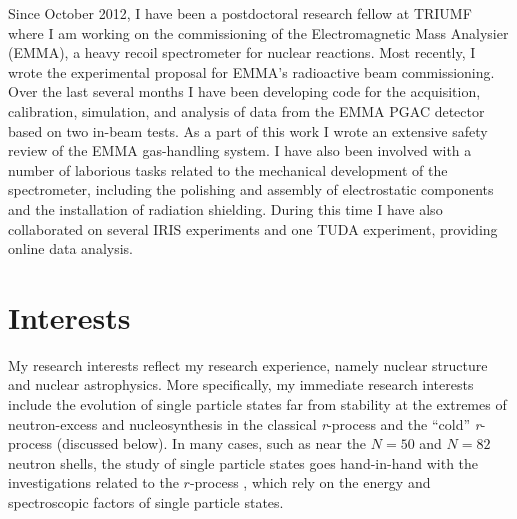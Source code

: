 {Since October 2012,
I have been a postdoctoral research fellow at TRIUMF where I am working
on the commissioning of the Electromagnetic Mass Analysier (EMMA), a heavy recoil spectrometer for nuclear reactions. %
Most recently, I wrote the experimental proposal for EMMA's radioactive beam commissioning. Over the last several months I have been developing code for the acquisition, calibration, simulation, and analysis of data from the EMMA PGAC detector based on two in-beam tests. As a part of this work I wrote an extensive safety review of the EMMA gas-handling system. I have also been involved with a number of laborious tasks related to the mechanical development of the spectrometer, including the polishing and assembly of  electrostatic components and the installation of radiation shielding.
		During this time I have also collaborated on several IRIS experiments and one TUDA experiment, providing online data analysis.

\section*{Interests}
My research interests reflect my research experience, namely nuclear structure and nuclear astrophysics.  More specifically, my immediate 
research interests include %
 the evolution of single particle states far from stability at the extremes of neutron-excess and nucleosynthesis in the classical \textit{r}-process and the ``cold'' \textit{r}-process (discussed below). In many cases, such as near the $N=50$ and $N=82$ neutron shells, the study of single particle states goes hand-in-hand with the investigations related to the $r$-process%
, which rely on the energy and spectroscopic factors of single particle states.

}
